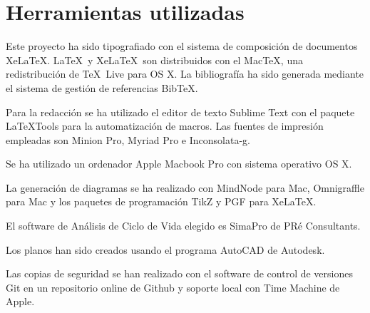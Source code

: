 \chapter{Herramientas utilizadas}\label{apend:herramientas}

Este proyecto ha sido tipografiado con el sistema de composición de documentos Xe\LaTeX. \LaTeX\ y Xe\LaTeX\ son distribuidos con el Mac\TeX, una redistribución de \TeX\ Live para OS X. La bibliografía ha sido generada mediante el sistema de gestión de referencias Bib\TeX.

Para la redacción se ha utilizado el editor de texto Sublime Text con el paquete LaTeXTools para la automatización de macros. Las fuentes de impresión empleadas son Minion Pro, Myriad Pro e Inconsolata-g.

Se ha utilizado un ordenador Apple Macbook Pro con sistema operativo OS X.

La generación de diagramas se ha realizado con MindNode para Mac, Omnigraffle para Mac y los paquetes de programación TikZ y PGF para Xe\LaTeX.

El software de Análisis de Ciclo de Vida elegido es SimaPro de PRé Consultants.

Los planos han sido creados usando el programa AutoCAD de Autodesk.

Las copias de seguridad se han realizado con el software de control de versiones Git en un repositorio online de Github y soporte local con Time Machine de Apple.
